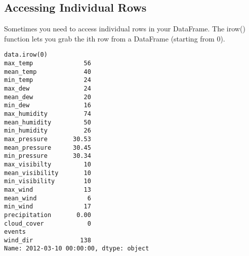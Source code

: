 \subsection{Accessing Individual Rows}
Sometimes you need to access individual rows in your DataFrame. The irow() function lets you grab the ith row from a DataFrame (starting from 0).
\begin{framed}
\begin{verbatim}
data.irow(0)
max_temp              56
mean_temp             40
min_temp              24
max_dew               24
mean_dew              20
min_dew               16
max_humidity          74
mean_humidity         50
min_humidity          26
max_pressure       30.53
mean_pressure      30.45
min_pressure       30.34
max_visibilty         10
mean_visibility       10
min_visibility        10
max_wind              13
mean_wind              6
min_wind              17
precipitation       0.00
cloud_cover            0
events                  
wind_dir             138
Name: 2012-03-10 00:00:00, dtype: object
\end{verbatim}
\end{framed}

